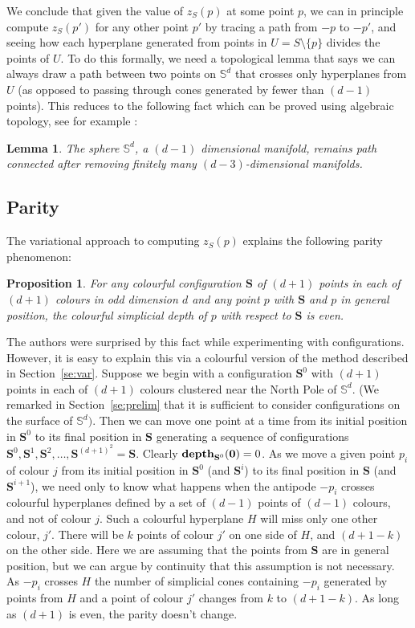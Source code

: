 \documentclass[epsbox,12pt,reqno]{amsart}
\newtheorem{proposition}[theorem]{Proposition}
\newtheorem{lemma}[theorem]{Lemma}
\theoremstyle{definition}
\theoremstyle{remark}
\def\csd{\mathbf{depth}}
\def\S{\mathbf{S}}
\def\Sph{\mathbb{S}}
\def\zero{{\bf 0}}
\begin{document}
We conclude that given the value of $z_S(p)$ at some point $p$,
we can in principle compute $z_S(p')$ for any other point $p'$
by tracing a path from $-p$ to $-p'$, and seeing how each hyperplane 
generated from points in $U = S \setminus \{p\}$ divides the points
of $U$.  To do this formally, we need a topological lemma that 
says we can always draw a path between two points on $\Sph^d$ that
crosses only hyperplanes from $U$ (as opposed to passing through
cones generated by fewer than $(d-1)$ points).  
This reduces to the following fact which can be proved using
algebraic topology, see for example \cite{Mun84}:  
\begin{lemma}\label{le:top}
The sphere $\Sph^d$, a $(d-1)$ dimensional manifold, remains path 
connected after
removing finitely many $(d-3)$-dimensional manifolds. %
\end{lemma}

\subsection{Parity}\label{se:parity}
The variational approach to computing $z_S(p)$ explains the
following parity phenomenon:
\begin{proposition}\label{pr:mincfg}
For any colourful configuration $\S$ of $(d+1)$ points in each of $(d+1)$ 
colours in {\rm odd} dimension $d$ and any point $p$ with $\S$ and $p$
in general position, the colourful simplicial depth of $p$ 
with respect to $\S$ is {\rm even}.
\end{proposition}
The authors were surprised by this fact while experimenting with
configurations.  However, it is easy to explain this
via a colourful version of the method described in
Section~\ref{se:var}.  Suppose we begin with a %
configuration $\S^0$ with $(d+1)$ points in each of $(d+1)$
colours clustered near the North Pole of $\Sph^d$.  (We remarked
in Section~\ref{se:prelim} that it is sufficient to consider 
configurations on the surface of $\Sph^d)$.  
Then we can move one point at a time from its initial position
in $\S^0$ to its final position in $\S$ generating a sequence of
configurations $\S^0, \S^1, \S^2, \ldots, \S^{(d+1)^2}=\S$.
Clearly $\csd_{\S^0}(\zero)=0$.  As we move a given point $p_i$ of colour
$j$ from its
initial position in $\S^0$ (and $\S^i$) to its final position
in $\S$ (and $\S^{i+1}$), we need only to know what happens
when the antipode $-p_i$ crosses colourful hyperplanes defined by 
a set of $(d-1)$ points of $(d-1)$ colours, and not of colour $j$.
Such a colourful hyperplane $H$ will miss only one other colour, $j'$.
There will be $k$ points of colour $j'$ on one side of $H$, 
and $(d+1-k)$ on the other side.  
Here we are assuming that the points from $\S$ are in general position, 
but we can argue by continuity that this assumption is not necessary.
As $-p_i$ crosses
$H$ the number of simplicial cones containing $-p_i$ generated by points 
from $H$ and a point of colour $j'$ changes from $k$ to $(d+1-k)$.
As long as $(d+1)$ is even, the parity doesn't change. 
\end{document}
